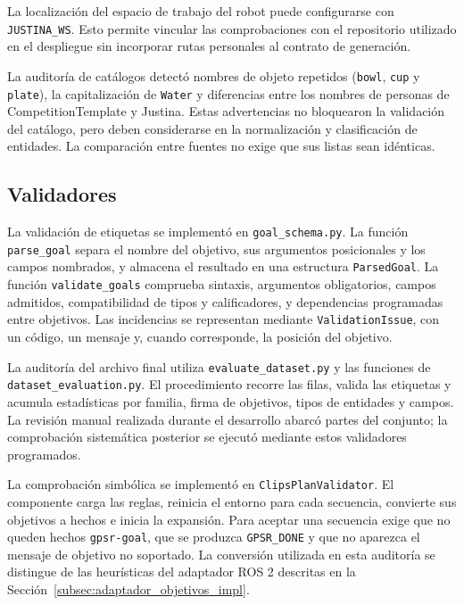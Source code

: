 La localización del espacio de trabajo del robot puede configurarse con
\texttt{JUSTINA\_WS}. Esto permite vincular las comprobaciones con el
repositorio utilizado en el despliegue sin incorporar rutas personales
al contrato de generación.

La auditoría de catálogos detectó nombres de objeto repetidos
(\texttt{bowl}, \texttt{cup} y \texttt{plate}), la capitalización de
\texttt{Water} y diferencias entre los nombres de personas de
CompetitionTemplate y Justina. Estas advertencias no bloquearon la
validación del catálogo, pero deben considerarse en la normalización y
clasificación de entidades. La comparación entre fuentes no exige que
sus listas sean idénticas.

\subsection{Validadores}

La validación de etiquetas se implementó en \texttt{goal\_\allowbreak schema.\allowbreak py}.
La función \texttt{parse\_goal} separa el nombre del objetivo, sus
argumentos posicionales y los campos nombrados, y almacena el resultado
en una estructura \texttt{ParsedGoal}. La función
\texttt{validate\_\allowbreak goals} comprueba sintaxis, argumentos obligatorios,
campos admitidos, compatibilidad de tipos y calificadores, y dependencias
programadas entre objetivos. Las incidencias se representan mediante
\texttt{Validation\allowbreak Issue}, con un código, un mensaje y, cuando corresponde,
la posición del objetivo.

La auditoría del archivo final utiliza \texttt{evaluate\_\allowbreak dataset.\allowbreak py}
y las funciones de \texttt{dataset\_\allowbreak evaluation.\allowbreak py}. El procedimiento
recorre las filas, valida las etiquetas y acumula estadísticas por
familia, firma de objetivos, tipos de entidades y campos. La revisión
manual realizada durante el desarrollo abarcó partes del conjunto;
la comprobación sistemática posterior se ejecutó mediante estos
validadores programados.

La comprobación simbólica se implementó en \texttt{Clips\allowbreak Plan\allowbreak Validator}.
El componente carga las reglas, reinicia el entorno para cada secuencia,
convierte sus objetivos a hechos e inicia la expansión. Para aceptar
una secuencia exige que no queden hechos \texttt{gpsr-goal}, que se
produzca \texttt{GPSR\_DONE} y que no aparezca el mensaje de objetivo
no soportado. La conversión utilizada en esta auditoría se distingue
de las heurísticas del adaptador ROS 2 descritas en la
Sección~\ref{subsec:adaptador_objetivos_impl}.

